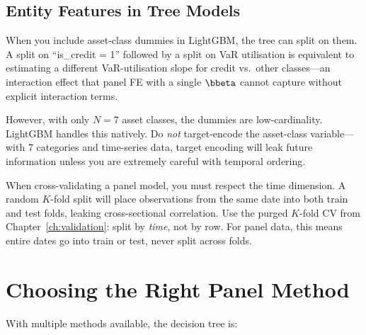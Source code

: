 \subsection{Entity Features in Tree Models}

When you include asset-class dummies in LightGBM, the tree can split on them.
A split on ``is\_credit = 1'' followed by a split on VaR utilisation is equivalent to estimating a different VaR-utilisation slope for credit vs.\ other classes---an interaction effect that panel FE with a single $\bbeta$ cannot capture without explicit interaction terms.

However, with only $N = 7$ asset classes, the dummies are low-cardinality.
LightGBM handles this natively.
Do \emph{not} target-encode the asset-class variable---with 7 categories and time-series data, target encoding will leak future information unless you are extremely careful with temporal ordering.

\begin{prereq}
When cross-validating a panel model, you must respect the time dimension.
A random $K$-fold split will place observations from the same date into both train and test folds, leaking cross-sectional correlation.
Use the purged $K$-fold CV from Chapter~\ref{ch:validation}: split by \emph{time}, not by row.
For panel data, this means entire dates go into train or test, never split across folds.
\end{prereq}

\section{Choosing the Right Panel Method}
\label{sec:panel-choice}

With multiple methods available, the decision tree is:

